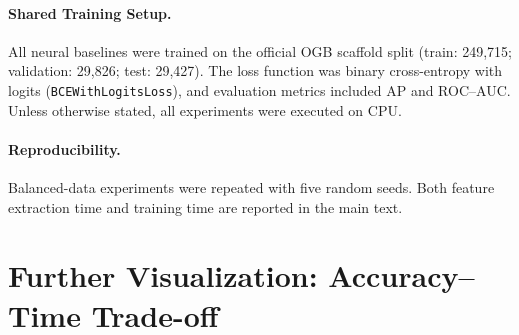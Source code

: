 \paragraph{Shared Training Setup.}
All neural baselines were trained on the official OGB scaffold split
(train: 249,715; validation: 29,826; test: 29,427).
The loss function was binary cross-entropy with logits
(\texttt{BCEWithLogitsLoss}), and evaluation metrics included AP and ROC--AUC.
Unless otherwise stated, all experiments were executed on CPU.

\paragraph{Reproducibility.}
Balanced-data experiments were repeated with five random seeds.
Both feature extraction time and training time are reported in the main text.

\section{Further Visualization: Accuracy--Time Trade-off}
\label{appendix:tradeoff}

